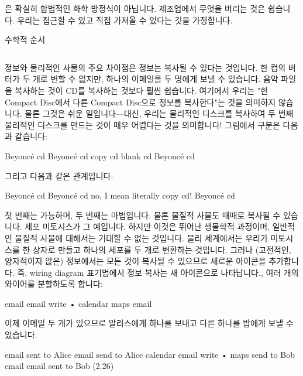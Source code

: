 \documentclass[11pt, a4paper, twoside, openany]{book}
\begin{document}
{\par\medskip
은 확실히 합법적인 화학 방정식이 아닙니다. 제조업에서 무엇을 버리는 것은 쉽습니다. 우리는 접근할 수 있고 직접 가져올 수 있다는 것을 가정합니다.

\par\medskip
수학적 순서

\par\medskip
$$ $$

\par\medskip
정보와 물리적인 사물의 주요 차이점은 정보는 복사될 수 있다는 것입니다. 한 컵의 버터가 두 개로 변할 수 없지만, 하나의 이메일을 두 명에게 보낼 수 있습니다. 음악 파일을 복사하는 것이 CD\hspace{0pt}를 복사하는 것보다 훨씬 쉽습니다. 여기에서 우리는 "한 Compact Disc\hspace{0pt}에서 다른 Compact Disc\hspace{0pt}으로 정보를 복사한다"는 것을 의미하지 않습니다. 물론 그것은 쉬운 일입니다—대신, 우리는 물리적인 디스크를 복사하여 두 번째 물리적인 디스크를 만드는 것이 매우 어렵다는 것을 의미합니다! 그림에서 구분은 다음과 같습니다:

\par\medskip
Beyoncé cd
Beyoncé cd
copy cd
blank cd
Beyoncé cd

\par\medskip
그리고 다음과 같은 관계입니다:

\par\medskip
Beyoncé cd
Beyoncé cd
no, I mean
literally copy cd!
Beyoncé cd

\par\medskip
첫 번째는 가능하며, 두 번째는 마법입니다. 물론 물질적 사물도 때때로 복사될 수 있습니다. 세포 미토시스가 그 예입니다. 하지만 이것은 뛰어난 생물학적 과정이며, 일반적인 물질적 사물에 대해서는 기대할 수 없는 것입니다. 물리 세계에서는 우리가 미토시스를 한 상자로 만들고 하나의 세포를 두 개로 변환하는 것입니다. 그러나 (고전적인, 양자적이지 않은) 정보에서는 모든 것이 복사될 수 있으므로 새로운 아이콘을 추가합니다. 즉, wiring diagram 표기법에서 정보 복사는 새 아이콘으로 나타납니다., 여러 개의 와이어를 분할하도록 합니다:

\par\medskip
email
email
write
•
calendar
maps
email

\par\medskip
이제 이메일 두 개가 있으므로 알리스에게 하나를 보내고 다른 하나를 밥에게 보낼 수 있습니다.

\par\medskip
email sent to Alice
email
send to Alice
calendar
email
write
•
maps
send to Bob
email
email sent to Bob
(2.26)

}
\end{document}

